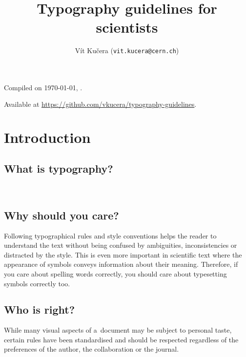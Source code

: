\documentclass[12pt,a4paper]{article}
\author{Vít Kučera (\texttt{vit.kucera@cern.ch})}
\title{Typography guidelines for scientists}
\begin{document}
\maketitle

\begin{center}
Compiled on \today, \currenttime.

Available at \url{https://github.com/vkucera/typography-guidelines}.
\end{center}



\tableofcontents

\section{Introduction}

\subsection{What is typography?}

~\cite{wiki-typography}

\subsection{Why should you care?}

Following typographical rules and style conventions helps the reader to understand the text without being confused by ambiguities, inconsistencies or distracted by the style.
This is even more important in scientific text where the appearance of symbols conveys information about their meaning.
Therefore, if you care about spelling words correctly, you should care about typesetting symbols correctly too.

\subsection{Who is right?}

While many visual aspects of a~document may be subject to personal taste, certain rules have been standardised and should be respected regardless of the preferences of the author, the collaboration or the journal.
\end{document}
